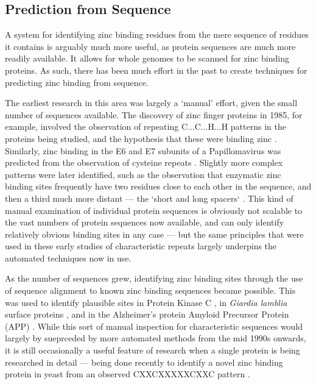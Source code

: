 \subsection{Prediction from Sequence}

A system for identifying zinc binding residues from the mere sequence of residues it contains is arguably much more useful, as protein sequences are much more readily available. It allows for whole genomes to be scanned for zinc binding proteins. As such, there has been much effort in the past to create techniques for predicting zinc binding from sequence.

The earliest research in this area was largely a `manual' effort, given the small number of sequences available. The discovery of zinc finger proteins in 1985, for example, involved the observation of repeating C...C...H...H patterns in the proteins being studied, and the hypothesis that these were binding zinc \cite{miller1985repetitive}. Similarly, zinc binding in the E6 and E7 subunits of a Papillomavirus was predicted from the observation of cysteine repeats \cite{barbosa1989papillomavirus}. Slightly more complex patterns were later identified, such as the observation that enzymatic zinc binding sites frequently have two residues close to each other in the sequence, and then a third much more distant --- the `short and long spacers` \cite{vallee1989short}. This kind of manual examination of individual protein sequences is obviously not scalable to the vast numbers of protein sequences now available, and can only identify relatively obvious binding sites in any case --- but the same principles that were used in these early studies of characteristic repeats largely underpins the automated techniques now in use.

As the number of sequences grew, identifying zinc binding sites through the use of sequence alignment to known zinc binding sequences became possible. This was used to identify plausible sites in Protein Kinase C \cite{bishop1991identification}, in {\it Giardia lamblia} surface proteins \cite{nash1993variant}, and in the Alzheimer's protein Amyloid Precursor Protein (APP) \cite{bush1993novel}. While this sort of manual inspection for characteristic sequences would largely by sueprceded by more automated methods from the mid 1990s onwards, it is still occasionally a useful feature of research when a single protein is being researched in detail --- being done recently to identify a novel zinc binding protein in yeast from an observed CXXCXXXXXCXXC pattern \cite{furukawa2018identification}.

